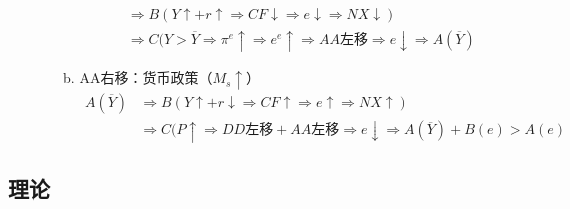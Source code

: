 \documentclass[12pt]{book}
\begin{document}
\begin{enumerate}[1.]
\begin{enumerate}[(1)]
\begin{enumerate}[a.]
\begin{align*}
                &\Rightarrow 
                    B(Y\uparrow+r\uparrow
                    \Rightarrow CF\downarrow
                    \Rightarrow e\downarrow
                    \Rightarrow NX\downarrow) \\ 
               & \Rightarrow 
                    C(Y>\overline{Y}
                    \Rightarrow\pi^e \uparrow
                    \Rightarrow e^e\uparrow
                    \Rightarrow AA\text{左移}
                    \Rightarrow e\downarrow
                    \Rightarrow A(\overline{Y})
            \end{align*}
            \item AA右移：货币政策（$M_s\uparrow$）
            \begin{align*}
                A(\overline{Y})
                &\Rightarrow 
                    B(Y\uparrow+r↓
                    \Rightarrow CF\uparrow
                    \Rightarrow e\uparrow
                    \Rightarrow NX\uparrow )
                \\&\Rightarrow 
                    C(P\uparrow
                    \Rightarrow DD\text{左移}+AA\text{左移}
                    \Rightarrow e\downarrow
                    \Rightarrow A(\overline{Y})+B(e)>A(e)
            \end{align*}
        \end{enumerate}    
    \end{enumerate}
\end{enumerate}





















\subsection{理论}
\end{document}
